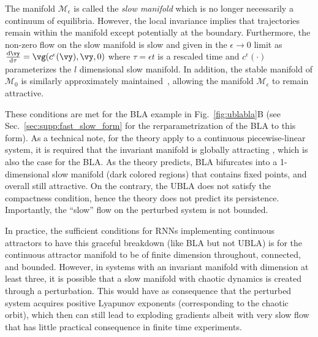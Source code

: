 \documentclass{article} %
\newcounter{ct}
\newcommand{\dm}[1]{\ensuremath{\mathrm{d}{#1}}} %
\newcommand{\RN}[2]{\frac{\dm{#1}}{\dm{#2}}} %
\newcommand{\manifold}{\mathcal{M}}
\theoremstyle{definition}
\theoremstyle{remark}
\renewcommand{\cite}{\citep}
\begin{document}
The manifold $\manifold_\epsilon$ is called the \emph{slow manifold} which is no longer necessarily a continuum of equilibria.
However, the local invariance implies that trajectories remain within the manifold except potentially at the boundary.
Furthermore, the non-zero flow on the slow manifold is slow and given in the $\epsilon \to 0$ limit as $\RN{\vy}{\tau} = \vg(c^\epsilon(\vy), \vy, 0)$ where $\tau = \epsilon t$ is a rescaled time and $c^\epsilon(\cdot)$ parameterizes the $l$ dimensional slow manifold.
In addition, the stable manifold of $\manifold_0$ is similarly approximately maintained~\cite{Jones1995}, allowing the manifold $\manifold_\epsilon$ to remain attractive.

These conditions are met  for the BLA example in Fig.~\ref{fig:ublabla}B (see Sec.~\ref{sec:supp:fast_slow_form} for the rerparametrization of the BLA to this form). As a technical note, for the theory apply to a continuous piecewise-linear system, it is required that the invariant manifold is globally attracting \cite{simpson2018}, which is also the case for the BLA.
As the theory predicts, BLA bifurcates into a 1-dimensional slow manifold (dark colored regions) that contains fixed points, and overall still attractive.
On the contrary, the UBLA does not satisfy the compactness condition, hence the theory does not predict its persistence. %
Importantly, the ``slow'' flow on the perturbed system is not bounded.


In practice, the sufficient conditions for RNNs implementing continuous attractors to have this graceful breakdown (like BLA but not UBLA) is for the continuous attractor manifold to be of finite dimension throughout, connected, and bounded.
However, in systems with an invariant manifold with dimension at least three, it is possible that a slow manifold with chaotic dynamics is created through a perturbation. This would have as consequence that the perturbed system acquires positive Lyapunov exponents (corresponding to the chaotic orbit), which then can still lead to exploding gradients albeit with very slow flow that has little practical consequence in finite time experiments.
\end{document}
